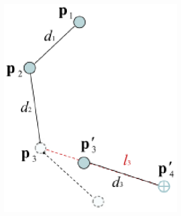 \begin{figure}
\begin{subfigure}{0.2\textwidth}
        \includegraphics[width=\linewidth]{grafika/fabrik_iteration3.eps}
        \subcaption{}
        \label{fig:fabrik3}
    \end{subfigure}
    \begin{subfigure}{0.2\textwidth}
        \centering

\end{subfigure}
\end{figure}
